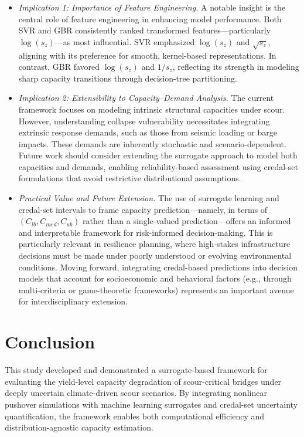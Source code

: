 \documentclass[authoryear,preprint,review,12pt]{elsarticle}
\begin{document}
\begin{itemize}
    \item \textit{Implication 1: Importance of Feature Engineering.} 
    A notable insight is the central role of feature engineering in enhancing model performance. Both SVR and GBR consistently ranked transformed features—particularly $\log(s_z)$—as most influential. SVR emphasized $\log(s_z)$ and $\sqrt{s_z}$, aligning with its preference for smooth, kernel-based representations. In contrast, GBR favored $\log(s_z)$ and $1/s_z$, reflecting its strength in modeling sharp capacity transitions through decision-tree partitioning.

    \item \textit{Implication 2: Extensibility to Capacity–Demand Analysis.} 
    The current framework focuses on modeling intrinsic structural capacities under scour. However, understanding collapse vulnerability necessitates integrating extrinsic response demands, such as those from seismic loading or barge impacts. These demands are inherently stochastic and scenario-dependent. Future work should consider extending the surrogate approach to model both capacities and demands, enabling reliability-based assessment using credal-set formulations that avoid restrictive distributional assumptions.

    \item \textit{Practical Value and Future Extension.} 
    The use of surrogate learning and credal-set intervals to frame capacity prediction—namely, in terms of $(C_{lb}, C_{med}, C_{ub})$ rather than a single-valued prediction—offers an informed and interpretable framework for risk-informed decision-making. This is particularly relevant in resilience planning, where high-stakes infrastructure decisions must be made under poorly understood or evolving environmental conditions. Moving forward, integrating credal-based predictions into decision models that account for socioeconomic and behavioral factors (e.g., through multi-criteria or game-theoretic frameworks) represents an important avenue for interdisciplinary extension.

\end{itemize}

\section{Conclusion}

This study developed and demonstrated a surrogate-based framework for evaluating the yield-level capacity degradation of scour-critical bridges under deeply uncertain climate-driven scour scenarios. By integrating nonlinear pushover simulations with machine learning surrogates and credal-set uncertainty quantification, the framework enables both computational efficiency and distribution-agnostic capacity estimation.
\end{document}
